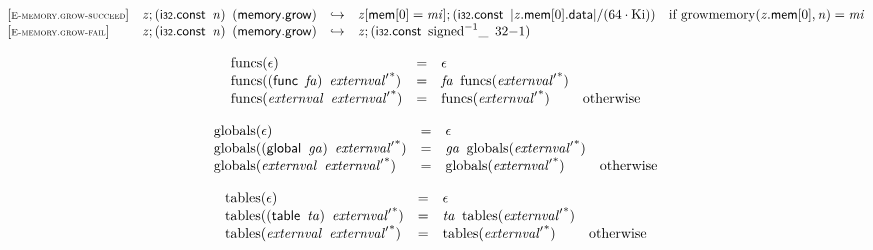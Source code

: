 \vspace{1ex}

$$
\begin{array}{@{}l@{}lcl@{}l@{}}
{[\textsc{\scriptsize E{-}memory.grow{-}succeed}]} \quad & {\mathit{z}} ; (\mathsf{i{\scriptstyle32}}.\mathsf{const}~\,{\mathit{n}})~\,(\mathsf{memory.grow}) &\hookrightarrow& {\mathit{z}}{}[\mathsf{mem}{}[0] = {\mathit{mi}}] ; (\mathsf{i{\scriptstyle32}}.\mathsf{const}~\,{|{{\mathit{z}}.\mathsf{mem}}{{}[0]}.\mathsf{data}|} / (64 \cdot {\mathrm{Ki}})) &\quad
  \mbox{if}~{\mathrm{growmemory}}({{\mathit{z}}.\mathsf{mem}}{{}[0]}, {\mathit{n}}) = {\mathit{mi}} \\
{[\textsc{\scriptsize E{-}memory.grow{-}fail}]} \quad & {\mathit{z}} ; (\mathsf{i{\scriptstyle32}}.\mathsf{const}~\,{\mathit{n}})~\,(\mathsf{memory.grow}) &\hookrightarrow& {\mathit{z}} ; (\mathsf{i{\scriptstyle32}}.\mathsf{const}~\,{{{{\mathrm{signed}}^{{-1}}}}{\mathsf{\_}}~\,32}{{-1}}) &  \\
\end{array}
$$

$$
\begin{array}{@{}lcl@{}l@{}}
{\mathrm{funcs}}(\epsilon) &=& \epsilon &  \\
{\mathrm{funcs}}((\mathsf{func}~\,{\mathit{fa}})~\,{{\mathit{externval}'}^\ast}) &=& {\mathit{fa}}~\,{\mathrm{funcs}}({{\mathit{externval}'}^\ast}) &  \\
{\mathrm{funcs}}({\mathit{externval}}~\,{{\mathit{externval}'}^\ast}) &=& {\mathrm{funcs}}({{\mathit{externval}'}^\ast}) &\quad
  \mbox{otherwise} \\
\end{array}
$$

$$
\begin{array}{@{}lcl@{}l@{}}
{\mathrm{globals}}(\epsilon) &=& \epsilon &  \\
{\mathrm{globals}}((\mathsf{global}~\,{\mathit{ga}})~\,{{\mathit{externval}'}^\ast}) &=& {\mathit{ga}}~\,{\mathrm{globals}}({{\mathit{externval}'}^\ast}) &  \\
{\mathrm{globals}}({\mathit{externval}}~\,{{\mathit{externval}'}^\ast}) &=& {\mathrm{globals}}({{\mathit{externval}'}^\ast}) &\quad
  \mbox{otherwise} \\
\end{array}
$$

$$
\begin{array}{@{}lcl@{}l@{}}
{\mathrm{tables}}(\epsilon) &=& \epsilon &  \\
{\mathrm{tables}}((\mathsf{table}~\,{\mathit{ta}})~\,{{\mathit{externval}'}^\ast}) &=& {\mathit{ta}}~\,{\mathrm{tables}}({{\mathit{externval}'}^\ast}) &  \\
{\mathrm{tables}}({\mathit{externval}}~\,{{\mathit{externval}'}^\ast}) &=& {\mathrm{tables}}({{\mathit{externval}'}^\ast}) &\quad
  \mbox{otherwise} \\
\end{array}
$$

